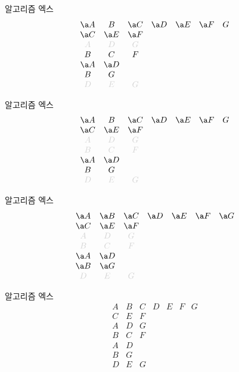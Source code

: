 \documentclass[xcolor=svgnames]{beamer}
\begin{document}
%
\begin{frame}{알고리즘 엑스}
\Large\boldmath
  $$
  \begin{array}{ccccccc}
    \a A & B & \a C & \a D & \a E & \a F & G\\
    \a C & \a E & \a F &&&&\\
    \g A & \g D & \g G &&&&\\
    B & C & F &&&&\\
    \a A & \a D &&&&&\\
    B & G &&&&&\\
    \g D & \g E & \g G &&&&
  \end{array}
  $$
\end{frame}

%
\begin{frame}{알고리즘 엑스}
\Large\boldmath
  $$
  \begin{array}{ccccccc}
    \a A & B & \a C & \a D & \a E & \a F & G\\
    \a C & \a E & \a F &&&&\\
    \g A & \g D & \g G &&&&\\
    \g B & \g C & \g F &&&&\\
    \a A & \a D &&&&&\\
    B & G &&&&&\\
    \g D & \g E & \g G &&&&
  \end{array}
  $$
\end{frame}

%
\begin{frame}{알고리즘 엑스}
\Large\boldmath
$$
  \begin{array}{ccccccc}
    \a A & \a B & \a C & \a D & \a E & \a F & \a G\\
    \a C & \a E & \a F &&&&\\
    \g A & \g D & \g G &&&&\\
    \g B & \g C & \g F &&&&\\
    \a A & \a D &&&&&\\
    \a B & \a G &&&&&\\
    \g D & \g E & \g G &&&&
  \end{array}
  $$
\end{frame}

%
\begin{frame}{알고리즘 엑스}
\Large\boldmath
  $$
  \begin{array}{ccccccc}
    A & B & C & D & E & F & G\\
    C & E & F &&&&\\
    A & D & G &&&&\\
    B & C & F &&&&\\
    A & D &&&&&\\
    B & G &&&&&\\
    D & E & G &&&&
  \end{array}
  $$
\end{frame}
\end{document}
